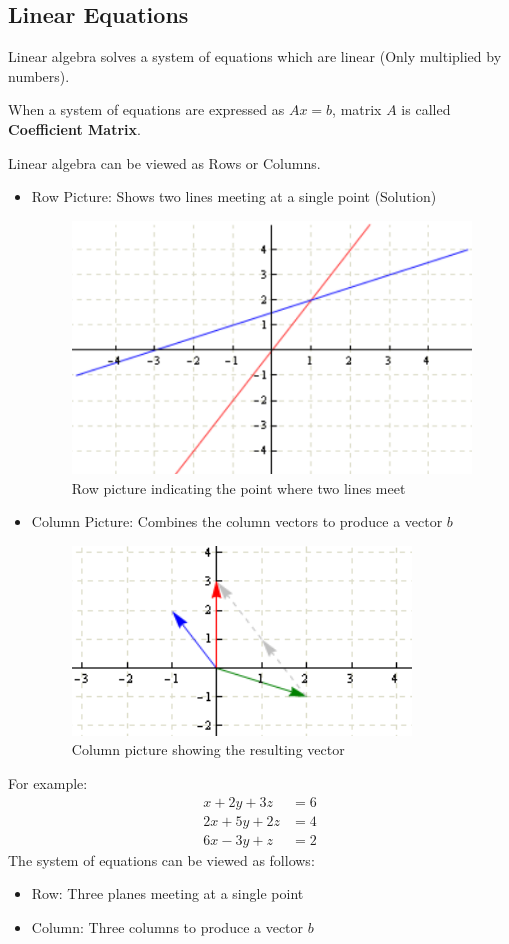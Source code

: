 \documentclass[10pt,a4paper]{article}
\begin{document}
\subsection{Linear Equations}
Linear algebra solves a system of equations which are linear (Only multiplied by numbers). 
\par When a system of equations are expressed as $Ax=b$, matrix $A$ is called \textbf{Coefficient
Matrix}.
\par
Linear algebra can be viewed as Rows or Columns.
\begin{itemize}
	\item Row Picture: Shows two lines meeting at a single point (Solution)
	\begin{figure}[h!]
		\centering
		\includegraphics[scale=0.5]{Row.PNG}
		\caption{Row picture indicating the point where two lines meet}
		\label{}
	\end{figure}
	\item Column Picture: Combines the column vectors to produce a vector $b$
	\begin{figure}[h!]
		\centering
		\includegraphics[scale=0.5]{Column.PNG}
		\caption{Column picture showing the resulting vector}
		\label{}
	\end{figure}
\end{itemize}

For example:
\begin{align*} 
	x + 2y + 3z &=  6 \\ 
	2x + 5y + 2z &=  4\\
	6x - 3y + z &= 2
\end{align*}
The system of equations can be viewed as follows:
\begin{itemize}
	\item Row: Three planes meeting at a single point
	\item Column: Three columns to produce a vector $b$
\end{itemize}
\pagebreak
\end{document}
